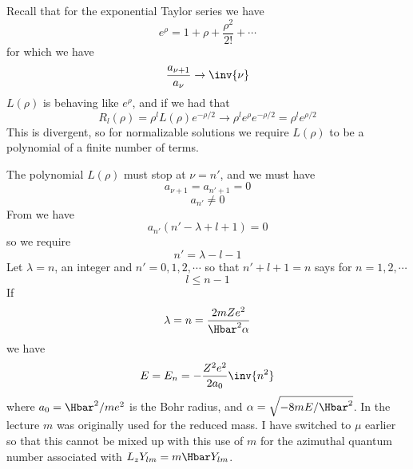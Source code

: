 %
Recall that for the exponential Taylor series we have
\begin{equation}\label{eqn:PHY356FLecture10:230}
e^\rho = 1 + \rho + \frac{\rho^2}{2!} + \cdots
\end{equation}
%
for which we have
\begin{equation}\label{eqn:PHY356FLecture10:240}
\frac{a_{\nu+1}}{a_\nu} \rightarrow \inv{\nu}
\end{equation}
%
\(L(\rho)\) is behaving like \(e^\rho\), and if we had that
%
\begin{equation}\label{eqn:PHY356FLecture10:250}
R_l(\rho) = \rho^l L(\rho) e^{-\rho/2} \rightarrow \rho^l e^\rho e^{-\rho/2} = \rho^l e^{\rho/2}
\end{equation}
%
This is divergent, so for normalizable solutions we require \(L(\rho)\) to be a polynomial of a finite number of terms.

The polynomial \(L(\rho)\) must stop at \(\nu = n'\), and we must have
%
\begin{equation}\label{eqn:PHY356FLecture10:260}
a_{\nu+1} = a_{n' +1} = 0
\end{equation}
\begin{equation}\label{eqn:PHY356FLecture10:270}
a_{n'} \ne 0
\end{equation}
%
From  we have
%
\begin{equation}\label{eqn:PHY356FLecture10:200a}
a_{n'} \left(
n' - \lambda + l + 1
\right)
=0
\end{equation}
%
so we require
\begin{equation}\label{eqn:PHY356FLecture10:280}
n' = \lambda - l - 1
\end{equation}
%
Let \(\lambda = n\), an integer and \(n' = 0, 1, 2, \cdots\) so that \(n' + l + 1 = n\) says for \(n= 1,2, \cdots\)
%
\begin{equation}\label{eqn:PHY356FLecture10:290}
l \le n-1
\end{equation}
%
If
%
\begin{equation}\label{eqn:PHY356FLecture10:300}
\lambda = n = \frac{2 m Z e^2 }{\Hbar^2 \alpha}
\end{equation}
%
we have
\begin{equation}\label{eqn:PHY356FLecture10:310}
E = E_n = - \frac{Z^2 e^2 }{2 a_0} \inv{n^2}
\end{equation}
%
where \(a_0 = \Hbar^2/m e^2\) is the Bohr radius, and \(\alpha = \sqrt{-8 m E/\Hbar^2}\).  In the lecture \(m\) was originally used for the reduced mass.  I have switched to \(\mu\) earlier so that this cannot be mixed up with this use of \(m\) for the azimuthal quantum number associated with \(L_z Y_{lm} = m \Hbar Y_{lm}\).

